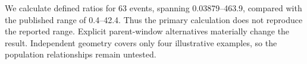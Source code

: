 We calculate defined ratios for 63 events, spanning 0.03879--463.9, compared with the published range of 0.4--42.4. Thus the primary calculation does not reproduce the reported range. Explicit parent-window alternatives materially change the result. Independent geometry covers only four illustrative examples, so the population relationships remain untested.
